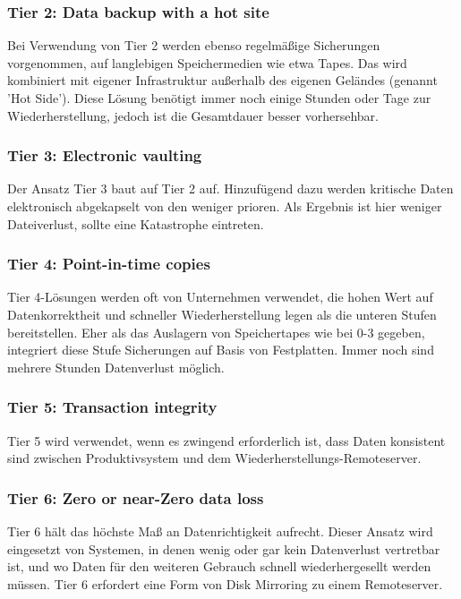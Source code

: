 \documentclass[letterpaper, 12pt]{article}
\let\tempsubsubsection\subsubsection
\renewcommand\subsubsection[1]{\vspace{0cm}\tempsubsubsection{#1}\vspace{0cm}}
\begin{document}
\subsubsection{Tier 2: Data backup with a hot site}

Bei Verwendung von Tier 2 werden ebenso regelmäßige Sicherungen vorgenommen, auf langlebigen
Speichermedien wie etwa Tapes. Das wird kombiniert mit eigener Infrastruktur außerhalb des
eigenen Geländes (genannt ’Hot Side’). Diese Lösung benötigt immer noch einige Stunden oder Tage zur Wiederherstellung,
jedoch ist die Gesamtdauer besser vorhersehbar. \cite{ausarbeitungdis}

\subsubsection{Tier 3: Electronic vaulting}

Der Ansatz Tier 3 baut auf Tier 2 auf. Hinzufügend dazu werden kritische Daten elektronisch abgekapselt
von den weniger prioren. Als Ergebnis ist hier weniger Dateiverlust, sollte eine Katastrophe
eintreten. \cite{ausarbeitungdis}

\subsubsection{Tier 4: Point-in-time copies}

Tier 4-Lösungen werden oft von Unternehmen verwendet, die hohen Wert auf Datenkorrektheit
und schneller Wiederherstellung legen als die unteren Stufen bereitstellen. Eher als das Auslagern
von Speichertapes wie bei 0-3 gegeben, integriert diese Stufe Sicherungen auf Basis von
Festplatten. Immer noch sind mehrere Stunden Datenverlust möglich. \cite{ausarbeitungdis}

\subsubsection{Tier 5: Transaction integrity}

Tier 5 wird verwendet, wenn es zwingend erforderlich ist, dass Daten konsistent sind zwischen
Produktivsystem und dem Wiederherstellungs-Remoteserver. \cite{ausarbeitungdis}

\subsubsection{Tier 6: Zero or near-Zero data loss}

Tier 6 hält das höchste Maß an Datenrichtigkeit aufrecht. Dieser Ansatz wird eingesetzt von Systemen,
in denen wenig oder gar kein Datenverlust vertretbar ist, und wo Daten für den weiteren
Gebrauch schnell wiederhergesellt werden müssen. Tier 6 erfordert eine Form von Disk Mirroring zu einem Remoteserver. \cite{ausarbeitungdis}
\end{document}
